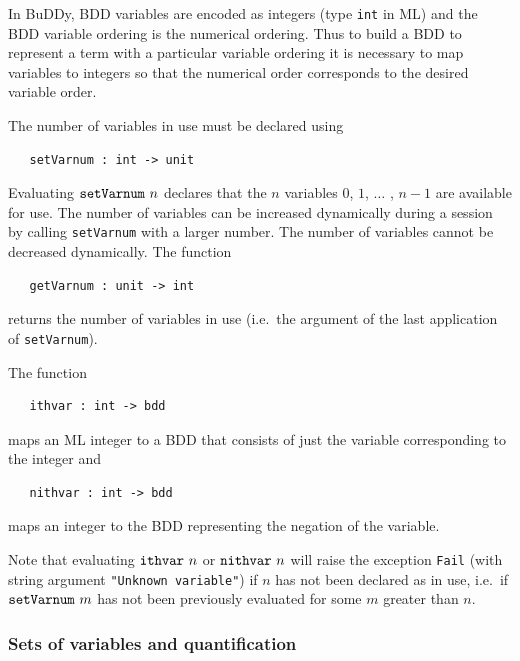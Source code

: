 \documentclass[12pt,fleqn]{book}
\renewcommand{\t}[1]{\mbox{\tt #1}}
\newcommand{\Buddy}{BuDDy{}}
\begin{document}
In \Buddy{}, BDD variables are encoded as integers (type \t{int} in ML) and the BDD variable ordering
is the numerical ordering. Thus to build a BDD to represent a \HOL{} term with a
particular variable ordering it is necessary to map \HOL{} variables to
integers so that the numerical order corresponds to the desired
variable order.

The number of variables in use must be declared using

\begin{verbatim}
   setVarnum : int -> unit
\end{verbatim}

Evaluating $\t{setVarnum}~n$ declares that the $n$ variables $0$,
$1$, $\ldots$ , $n{-}1$ are available for use. The number of variables
can be increased dynamically during a session by calling \t{setVarnum}
with a larger number. The number of variables cannot be decreased
dynamically. The function

\begin{verbatim}
   getVarnum : unit -> int
\end{verbatim}

returns the number of variables in use (i.e.~the argument of the last
application of \t{setVarnum}).

The function

\begin{verbatim}
   ithvar : int -> bdd
\end{verbatim}

maps an ML integer to a BDD that consists of just the variable
corresponding to the integer and

\begin{verbatim}
   nithvar : int -> bdd
\end{verbatim}

maps
an integer to the BDD representing the negation of the variable.

Note that evaluating $\t{ithvar}~n$ or $\t{nithvar}~n$ will raise the exception
\t{Fail} (with string argument \texttt{"Unknown variable"})
if $n$ has not been declared as in use, i.e.~if
$\t{setVarnum}~m$ has not been previously evaluated for some $m$
greater than $n$.


\subsubsection{Sets of variables and quantification}\label{varSet}
\end{document}
